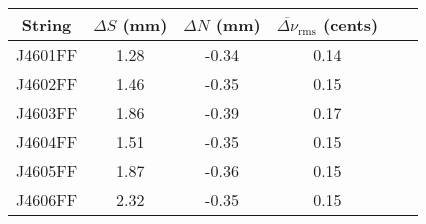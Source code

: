 \begin{tabular}{cccccc}
\toprule
String & $\Delta S$ (mm) & $\Delta N$ (mm) & $\overline{\Delta \nu}_\text{rms}$ (cents) \\
\midrule
J4601FF & 1.28 & -0.34 & 0.14 \\
J4602FF & 1.46 & -0.35 & 0.15 \\
J4603FF & 1.86 & -0.39 & 0.17 \\
J4604FF & 1.51 & -0.35 & 0.15 \\
J4605FF & 1.87 & -0.36 & 0.15 \\
J4606FF & 2.32 & -0.35 & 0.15 \\
\bottomrule
\end{tabular}

